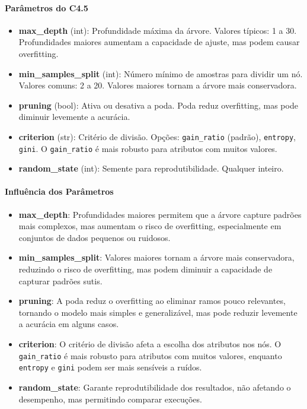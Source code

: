 \documentclass[11pt]{article}
\begin{document}
\paragraph{Parâmetros do C4.5}
\begin{itemize}
    \item \textbf{max\_depth} (int): Profundidade máxima da árvore. Valores típicos: 1 a 30. Profundidades maiores aumentam a capacidade de ajuste, mas podem causar overfitting.
    \item \textbf{min\_samples\_split} (int): Número mínimo de amostras para dividir um nó. Valores comuns: 2 a 20. Valores maiores tornam a árvore mais conservadora.
    \item \textbf{pruning} (bool): Ativa ou desativa a poda. Poda reduz overfitting, mas pode diminuir levemente a acurácia.
    \item \textbf{criterion} (str): Critério de divisão. Opções: \texttt{gain\_ratio} (padrão), \texttt{entropy}, \texttt{gini}. O \texttt{gain\_ratio} é mais robusto para atributos com muitos valores.
    \item \textbf{random\_state} (int): Semente para reprodutibilidade. Qualquer inteiro.
\end{itemize}

\paragraph{Influência dos Parâmetros}
\begin{itemize}
    \item \textbf{max\_depth}: Profundidades maiores permitem que a árvore capture padrões mais complexos, mas aumentam o risco de overfitting, especialmente em conjuntos de dados pequenos ou ruidosos.
    \item \textbf{min\_samples\_split}: Valores maiores tornam a árvore mais conservadora, reduzindo o risco de overfitting, mas podem diminuir a capacidade de capturar padrões sutis.
    \item \textbf{pruning}: A poda reduz o overfitting ao eliminar ramos pouco relevantes, tornando o modelo mais simples e generalizável, mas pode reduzir levemente a acurácia em alguns casos.
    \item \textbf{criterion}: O critério de divisão afeta a escolha dos atributos nos nós. O \texttt{gain\_ratio} é mais robusto para atributos com muitos valores, enquanto \texttt{entropy} e \texttt{gini} podem ser mais sensíveis a ruídos.
    \item \textbf{random\_state}: Garante reprodutibilidade dos resultados, não afetando o desempenho, mas permitindo comparar execuções.
\end{itemize}
\end{document}

